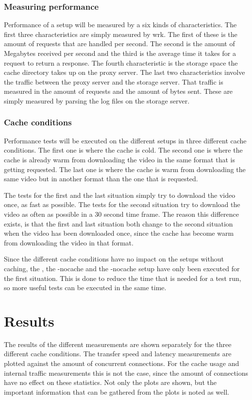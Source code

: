 \documentclass[twoside,openright]{uva-bachelor-thesis}
\begin{document}
\subsubsection{Measuring performance}
Performance of a setup will be measured by a six kinds of characteristics. The
first three characteristics are simply measured by wrk. The first of these is
the amount of requests that are handled per second. The second is the amount of
Megabytes received per second and the third is the average time it takes for a
request to return a response. The fourth characteristic is the storage space the
cache directory takes up on the proxy server. The last two characteristics
involve the traffic between the proxy server and the storage server. That
traffic is measured in the amount of requests and the amount of bytes sent.
These are simply measured by parsing the log files on the storage server.

\subsubsection{Cache conditions}
Performance tests will be executed on the different setups in three different
cache conditions. The first one is where the cache is cold. The second one is
where the cache is already warm from downloading the video in the same format
that is getting requested. The last one is where the cache is warm from
downloading the same video but in another format than the one that is requested.

The tests for the first and the last situation simply try to download the video
once, as fast as possible. The tests for the second situation try to download
the video as often as possible in a 30 second time frame. The reason this
difference exists, is that the first and last situation both change to the
second situation when the video has been downloaded once, since the cache has
become warm from downloading the video in that format.

Since the different cache conditions have no impact on the setups without
caching, the \ipp, the \cdn-nocache and the \lt-nocache setup have only been
executed for the first situation. This is done to reduce the time that is needed
for a test run, so more useful tests can be executed in the same time.





\section{Results}
The results of the different measurements are shown separately for the three
different cache conditions. The transfer speed and latency measurements are
plotted against the amount of concurrent connections. For the cache usage and
internal traffic measurements this is not the case, since the amount of
connections have no effect on these statistics. Not only the plots are shown,
but the important information that can be gathered from the plots is noted as
well.
\end{document}
